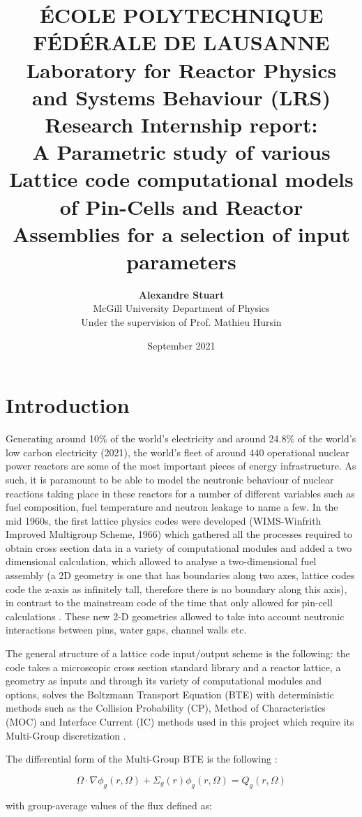 \documentclass[12pt]{article}
\title{\textbf{ÉCOLE POLYTECHNIQUE FÉDÉRALE DE LAUSANNE \\ Laboratory for Reactor Physics and Systems Behaviour (LRS) \\ Research Internship report: 
\\ A Parametric study of various Lattice code computational models of Pin-Cells and Reactor Assemblies for a selection of input parameters}}
\author{\textbf{Alexandre Stuart} \\ McGill University Department of Physics\\[0.5cm]  Under the supervision of Prof. Mathieu Hursin}
\date{September 2021}
\begin{document}
\maketitle
\section{Introduction}

Generating around 10\% of the world's electricity and around 24.8\% of the world's low carbon electricity (2021), the world's fleet of around 440 operational nuclear power reactors are some of the most important pieces of energy infrastructure. As such, it is paramount to be able to model the neutronic behaviour of nuclear reactions taking place in these reactors for a number of different variables such as fuel composition, fuel temperature and neutron leakage to name a few. In the mid 1960s, the first lattice physics codes were developed (WIMS-Winfrith Improved Multigroup Scheme, 1966) which gathered all the processes required to obtain cross section data in a variety of computational modules and added a two dimensional calculation, which allowed to analyse a two-dimensional fuel assembly (a 2D geometry is one that has boundaries along two axes, lattice codes code the z-axis as infinitely tall, therefore there is no boundary along this axis), in contrast to the mainstream code of the time that only allowed for pin-cell calculations \cite{Knott2010}. These new 2-D geometries allowed to take into account neutronic interactions between pins, water gaps, channel walls etc. 

The general structure of a lattice code input/output scheme is the following: the code takes a microscopic cross section standard library and a reactor lattice, a geometry as inputs and through its variety of computational modules and options, solves the  Boltzmann Transport Equation (BTE) with deterministic methods such as the Collision Probability (CP), Method of Characteristics (MOC) and Interface Current (IC) methods used in this project which require its Multi-Group discretization \cite{ghasabyan2020validation}. 

The differential form of the Multi-Group BTE is the following \cite{ligou1997introduction}:

\begin{equation}
    \Omega \cdot \nabla \phi_g(r, \Omega) + \Sigma_g(r)\phi_g(r, \Omega) =Q_g(r, \Omega)
\end{equation}

with group-average values of the flux defined as: 
\end{document}
